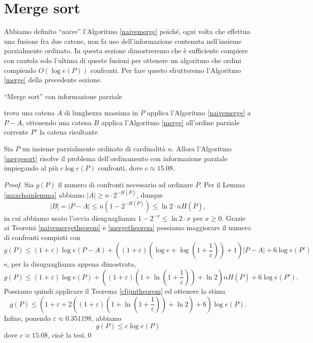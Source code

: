 \section{Merge sort} Abbiamo definito ``naive'' l'Algoritmo \ref{naivemerge} poich\'e, ogni volta che effettua una fusione fra due catene, non fa uso dell'informazione contenuta nell'insieme parzialmente ordinato. In questa sezione dimostreremo che \`e sufficiente compiere con cautela solo l'ultima di queste fusioni per ottenere un algoritmo che ordini compiendo \(O(\log{e(P)})\) confronti. Per fare questo sfrutteremo l'Algoritmo \ref{merge} della precedente sezione. 
\begin{algorithm}
  \caption{``Merge sort'' con informazione parziale} \label{mergesort} 
  \begin{algorithmic}
    [1] \STATE trova una catena \(A\) di lunghezza massima in \(P\) \STATE applica l'Algoritmo \ref{naivemerge} a \(P-A\), ottenendo una catena \(B\) \STATE applica l'Algoritmo \ref{merge} all'ordine parziale corrente \(P'\) \RETURN la catena risultante 
  \end{algorithmic}
\end{algorithm}
\begin{theorem}
  \label{mergesorttheorem} Sia \(P\) un insieme parzialmente ordinato di cardinalità \(n\). Allora l'Algoritmo \ref{mergesort} risolve il problema dell'ordinamento con informazione parziale impiegando al più \(c \log{e(P)}\) confronti, dove \(c\approx 15.08\). 
\end{theorem}
\begin{proof}
  Sia \(g(P)\) il numero di confronti necessario ad ordinare \(P\). Per il Lemma \ref{maxchainlemma} abbiamo \(|A|\ge n\cdot 2^{-H(\overline{P})}\), dunque
  \[|B|=|P-A|\le n\left(1-2^{-H(\overline{P})}\right)\le\ln{2}\cdot nH(\overline{P}),\]
  in cui abbiamo usato l'ovvia disuguaglianza \(1-2^{-x}\le\ln{2}\cdot x\) per \(x\ge 0\). Grazie ai Teoremi \ref{naivemergetheorem} e \ref{mergetheorem} possiamo maggiorare il numero di confronti compiuti con
  \[g(P)\le(1+\varepsilon)\log{e(P-A)}+\left((1+\varepsilon)\left(\log{e}+\log{\left(1+\frac{1}{\varepsilon}\right)}\right)+1\right)|P-A|+6\log{e(P')}\]
  e, per la disuguaglianza appena dimostrata,
  \[ g(P)\le(1+\varepsilon)\log{e(P)}+\left((1+\varepsilon)\left(1+\ln{\left(1+\frac{1}{\varepsilon}\right)}\right)+\ln{2}\right)nH(\overline{P})+6\log{e(P')}.\]
  Possiamo quindi applicare il Teorema \ref{cfjjmtheorem} ed ottenere la stima
  \[g(P)\le\left(1+\varepsilon+2\left((1+\varepsilon)\left(1+\ln{\left(1+\frac{1}{\varepsilon}\right)}\right)+\ln{2}\right)+6\right)\log{e(P)}.\]
  Infine, ponendo \(\varepsilon\approx 0.351198\), abbiamo
  \[g(P)\le c\log{e(P)}\nonumber\]
  dove \(c\approx 15.08\), cioè la tesi.\qed 
\end{proof}

